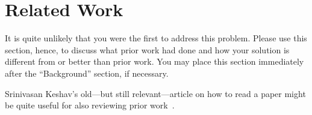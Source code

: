 \section{Related Work}\label{s:related}

It is quite unlikely that you were the first to address this problem. Please use
this section, hence, to discuss what prior work had done and how your solution
is different from or better than prior work. You may place this section
immediately after the “Background” section, if necessary.

\textcolor{lightgray}{\lipsum[26-29]}

Srinivasan Keshav's old---but still relevant---article on how to read a paper
might be quite useful for also reviewing prior work~\cite{Keshav-SIGCOMMCCR2007}.


